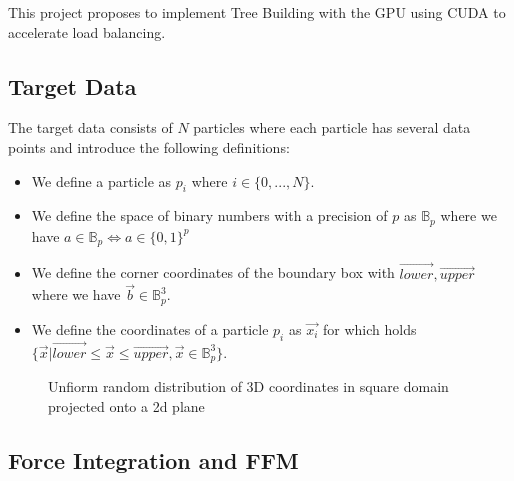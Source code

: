 \documentclass[]{article}
\begin{document}
This project proposes to implement Tree Building with the GPU using CUDA to accelerate load balancing.

\subsection{Target Data}\label{section:target-data}


The target data consists of $N$ particles where each particle has several data points and introduce the following definitions:

\begin{itemize}
	\item We define a particle as $p_i$  where $i \in \{0,...,N\}$. 
	\item We define the space of binary numbers with a precision of $p$ as $\mathbb{B}_p$ where we have $a \in \mathbb{B}_p \Leftrightarrow a \in \{0,1\}^{p}$
	\item We define the corner coordinates of the boundary box with $\vec{lower}, \vec{upper}$ where we have $\vec{b} \in \mathbb{B}_p^3$. 
	\item We define the coordinates of a particle $p_i$ as $\vec{x_i}$ for which holds $\{\vec{x} | \vec{lower} \leq \vec{x} \leq \vec{upper}, \vec{x} \in \mathbb{B}_p^3 \}$.

\end{itemize}

\begin{figure}[H]
	\begin{center}
	\end{center}
\caption{Unfiorm random distribution of 3D coordinates in square domain projected onto a 2d plane}
\end{figure}


\subsection{Force Integration and FFM}\label{section:force-integration}
\end{document}
